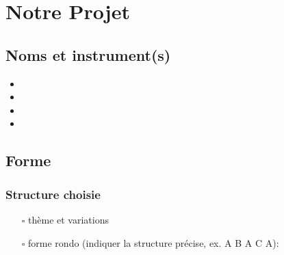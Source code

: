 \documentclass[11pt]{scrreprt}
\begin{document}
%
%
{}
\setcounter{secnumdepth}{0}
\chapter*{Notre Projet}

\section{Noms et instrument(s)}
\begin{itemize}
\item 
\item 
\item
\item
\end{itemize}

\section{Forme}
\subsection{Structure choisie}
\begin{itemize}
\item [$\square$] thème et variations
\item [$\square$] forme rondo (indiquer la structure précise, ex. A B A C A):
\end{itemize}
\end{document}
